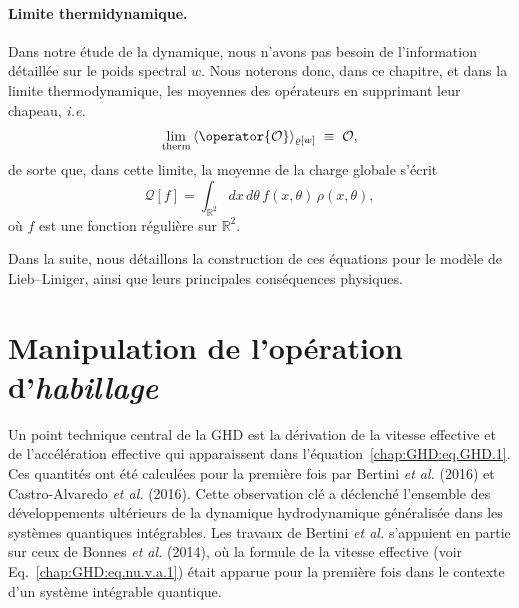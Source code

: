 \medskip

\begin{mdframed}[
	linewidth=0.5pt, 
	backgroundcolor=gray!5, 
	roundcorner=50pt,	
	innerleftmargin=5pt,
    innerrightmargin=5pt,
    innertopmargin=-10pt,
    innerbottommargin=2pt,
    leftmargin=2pt,
    rightmargin=2pt
	]
\paragraph{Limite thermidynamique.}  
Dans notre étude de la dynamique, nous n’avons pas besoin de l’information détaillée sur le poids spectral $w$.  
Nous noterons donc, dans ce chapitre, et dans la limite thermodynamique, les moyennes des opérateurs en supprimant leur chapeau, \emph{i.e.}
\begin{equation}
\underset{\mathrm{therm}}{\lim} \, \langle \operator{\mathcal{O}} \rangle_{\varrho[w]} \; \equiv \; \mathcal{O},
\end{equation}
de sorte que, dans cette limite, la moyenne de la charge globale s’écrit
\begin{equation}\label{chap:GHD:eq.charge.global.1}
	\mathcal{Q}[f] 
	= \int_{\mathbb{R}^2} dx\, d\theta\, f(x, \theta)\, \rho(x, \theta),
\end{equation}
où $f$ est une fonction régulière sur $\mathbb{R}^2$.
\end{mdframed}

\medskip


Dans la suite, nous détaillons la construction de ces équations pour le modèle de Lieb–Liniger, ainsi que leurs principales conséquences physiques.


\section{Manipulation de l’opération d’\emph{habillage}}

Un point technique central de la \gls{GHD} est la dérivation de la vitesse effective et de l’accélération effective qui apparaissent dans l’équation~\eqref{chap:GHD:eq.GHD.1}.  
Ces quantités ont été calculées pour la première fois par Bertini \emph{et al.} (2016) et Castro-Alvaredo \emph{et al.} (2016).  
Cette observation clé a déclenché l’ensemble des développements ultérieurs de la dynamique hydrodynamique généralisée dans les systèmes quantiques intégrables.  
Les travaux de Bertini \emph{et al.} s’appuient en partie sur ceux de Bonnes \emph{et al.} (2014), où la formule de la vitesse effective (voir Eq.~\eqref{chap:GHD:eq.nu.v.a.1}) était apparue pour la première fois dans le contexte d’un système intégrable quantique.

